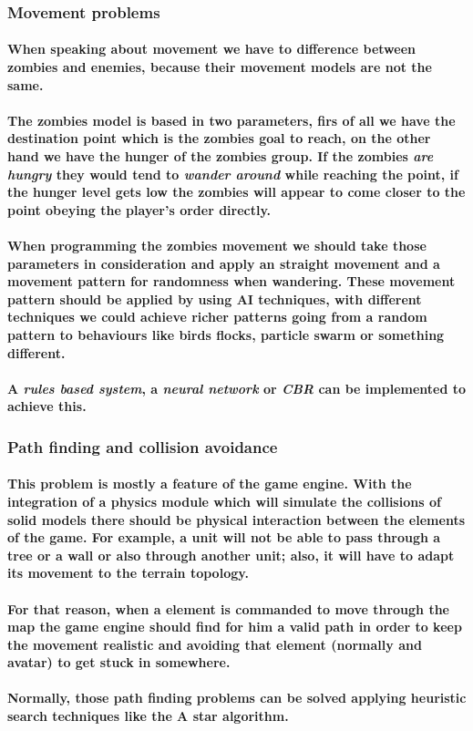 \documentclass[a4paper,10pt]{article}
\newcommand{\p}[1]{\paragraph{\indent\textnormal{#1}}}
\begin{document}
  \subsubsection{Movement problems}
    
    \p{When speaking about movement we have to difference between zombies and enemies, because their movement models are not the same.}

    \p{The zombies model is based in two parameters, firs of all we have the destination point which is the zombies goal to reach, on the other hand we have the hunger of the zombies group. If the zombies \textit{are hungry} they would tend to \textit{wander around} while reaching the point, if the hunger level gets low the zombies will appear to come closer to the point obeying the player's order directly.}

    \p{When programming the zombies movement we should take those parameters in consideration and apply an straight movement and a movement pattern for randomness when wandering. These movement pattern should be applied by using AI techniques, with different techniques we could achieve richer patterns going from a random pattern to behaviours like \textbf{birds flocks}, \textbf{particle swarm} or something different.}

    \p{A \textit{rules based system}, a \textit{neural network} or \textit{CBR} can be implemented to achieve this.}

   \subsubsection{Path finding and collision avoidance}

    \p{This problem is mostly a feature of the game engine. With the integration of a physics module which will simulate the collisions of solid models there should be physical interaction between the elements of the game. For example, a unit will not be able to pass through a tree or a wall or also through another unit; also, it will have to adapt its movement to the terrain topology.}

    \p{For that reason, when a element is commanded to move through the map the game engine should find for him a valid path in order to keep the movement realistic and avoiding that element (normally and avatar) to get stuck in somewhere.}

    \p{Normally, those path finding problems can be solved applying heuristic search techniques like the A star algorithm.}
\end{document}
